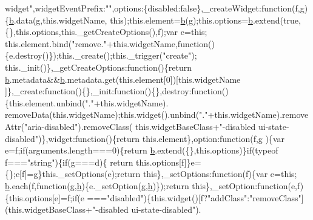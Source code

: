 \begin{DoxyCode}
{      widget"},widgetEventPrefix:\textcolor{stringliteral}{""},options:\{disabled:\textcolor{keyword}{false}\},\_createWidget:\textcolor{keyword}{function}(f,g)\{\hyperlink{jquery_8js_aa4026ad5544b958e54ce5e106fa1c805}{b}.data(g,this.widgetName,\textcolor{keyword}{
      this});this.element=\hyperlink{jquery_8js_aa4026ad5544b958e54ce5e106fa1c805}{b}(g);this.options=\hyperlink{jquery_8js_aa4026ad5544b958e54ce5e106fa1c805}{b}.extend(\textcolor{keyword}{true},\{\},this.options,this.\_getCreateOptions(),f);var e=\textcolor{keyword}{this};
      this.element.bind(\textcolor{stringliteral}{"remove."}+this.widgetName,\textcolor{keyword}{function}()\{e.destroy()\});this.\_create();this.\_trigger(\textcolor{stringliteral}{"create"});
      this.\_init()\},\_getCreateOptions:\textcolor{keyword}{function}()\{\textcolor{keywordflow}{return} \hyperlink{jquery_8js_aa4026ad5544b958e54ce5e106fa1c805}{b}.metadata&&\hyperlink{jquery_8js_aa4026ad5544b958e54ce5e106fa1c805}{b}.metadata.get(this.element[0])[this.widgetName
      ]\},\_create:\textcolor{keyword}{function}()\{\},\_init:\textcolor{keyword}{function}()\{\},destroy:\textcolor{keyword}{function}()\{this.element.unbind(\textcolor{stringliteral}{"."}+this.widgetName).
      removeData(this.widgetName);this.widget().unbind(\textcolor{stringliteral}{"."}+this.widgetName).removeAttr(\textcolor{stringliteral}{"aria-disabled"}).removeClass(
      this.widgetBaseClass+\textcolor{stringliteral}{"-disabled ui-state-disabled"})\},widget:\textcolor{keyword}{function}()\{\textcolor{keywordflow}{return} this.element\},option:\textcolor{keyword}{function}(f,g
      )\{var e=f;\textcolor{keywordflow}{if}(arguments.length===0)\{\textcolor{keywordflow}{return} \hyperlink{jquery_8js_aa4026ad5544b958e54ce5e106fa1c805}{b}.extend(\{\},this.options)\}\textcolor{keywordflow}{if}(typeof f===\textcolor{stringliteral}{"string"})\{\textcolor{keywordflow}{if}(g===d)\{\textcolor{keywordflow}{
      return} this.options[f]\}e=\{\};e[f]=g\}this.\_setOptions(e);\textcolor{keywordflow}{return} \textcolor{keyword}{this}\},\_setOptions:\textcolor{keyword}{function}(f)\{var e=\textcolor{keyword}{this};
      \hyperlink{jquery_8js_aa4026ad5544b958e54ce5e106fa1c805}{b}.each(f,\textcolor{keyword}{function}(g,\hyperlink{all__1a_8js_aebecdaf2444e2be39f4804412d6a3bf8}{h})\{e.\_setOption(g,\hyperlink{all__1a_8js_aebecdaf2444e2be39f4804412d6a3bf8}{h})\});\textcolor{keywordflow}{return} \textcolor{keyword}{this}\},\_setOption:\textcolor{keyword}{function}(e,f)\{this.options[e]=f;\textcolor{keywordflow}{if}(e
      ===\textcolor{stringliteral}{"disabled"})\{this.widget()[f?\textcolor{stringliteral}{"addClass"}:\textcolor{stringliteral}{"removeClass"}](this.widgetBaseClass+\textcolor{stringliteral}{"-disabled ui-state-disabled"}).

\end{DoxyCode}
